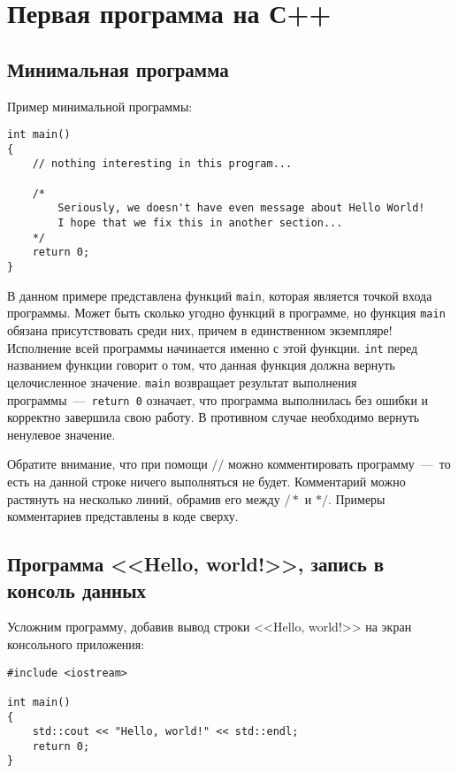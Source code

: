 \section{Первая программа на С++}
\subsection{Минимальная программа}

Пример минимальной программы:

\lstset{style=CPlusPlus}
\begin{lstlisting}
int main()
{
    // nothing interesting in this program...

    /*
        Seriously, we doesn't have even message about Hello World!
        I hope that we fix this in another section...
    */
    return 0;
}
\end{lstlisting}

В данном примере представлена функций \lstinline|main|, которая является точкой входа программы. Может быть сколько угодно функций в программе, но функция \lstinline|main| обязана присутствовать среди них, причем в единственном экземпляре! Исполнение всей программы начинается именно с этой функции. \lstinline|int| перед названием функции говорит о том, что данная функция должна вернуть целочисленное значение. \lstinline|main| возвращает результат выполнения программы~---~\lstinline|return 0| означает, что программа выполнилась без ошибки и корректно завершила свою работу. В противном случае необходимо вернуть ненулевое значение.

Обратите внимание, что при помощи $//$ можно комментировать программу~---~то есть на данной строке ничего выполняться не будет. Комментарий можно растянуть на несколько линий, обрамив его между $/*$ и $*/$. Примеры комментариев представлены в коде сверху.

\subsection{Программа <<Hello, world!>>, запись в консоль данных}

Усложним программу, добавив вывод строки <<Hello, world!>> на экран консольного приложения:

\begin{lstlisting}
#include <iostream>

int main()
{
    std::cout << "Hello, world!" << std::endl;
    return 0;
}
\end{lstlisting}

